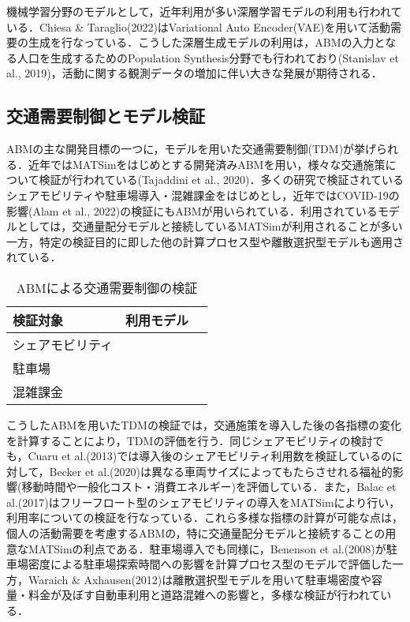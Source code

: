機械学習分野のモデルとして，近年利用が多い深層学習モデルの利用も行われている．Chiesa \& Taraglio(2022)はVariational Auto Encoder(VAE)を用いて活動需要の生成を行なっている．こうした深層生成モデルの利用は，ABMの入力となる人口を生成するためのPopulation Synthesis分野でも行われており(Stanislav et al., 2019)，活動に関する観測データの増加に伴い大きな発展が期待される．

\subsection{交通需要制御とモデル検証}\label{2.2.2}

ABMの主な開発目標の一つに，モデルを用いた交通需要制御(TDM)が挙げられる．近年ではMATSimをはじめとする開発済みABMを用い，様々な交通施策について検証が行われている(Tajaddini et al., 2020)．多くの研究で検証されているシェアモビリティや駐車場導入・混雑課金をはじめとし，近年ではCOVID-19の影響(Alam et al., 2022)の検証にもABMが用いられている．利用されているモデルとしては，交通量配分モデルと接続しているMATSimが利用されることが多い一方，特定の検証目的に即した他の計算プロセス型や離散選択型モデルも適用されている．

\begin{table}[tp]
	\begin{center}
		\caption{ABMによる交通需要制御の検証}
		\label{t3}
		\begin{tabular}{l|rr} 
			検証対象 & 利用モデル & \\ \hline
			シェアモビリティ \\
			駐車場 \\
			混雑課金 \\
		\end{tabular}
	\end{center}
\end{table}

こうしたABMを用いたTDMの検証では，交通施策を導入した後の各指標の変化を計算することにより，TDMの評価を行う．同じシェアモビリティの検討でも，Cuaru et al.(2013)では導入後のシェアモビリティ利用数を検証しているのに対して，Becker et al.(2020)は異なる車両サイズによってもたらさせれる福祉的影響(移動時間や一般化コスト・消費エネルギー)を評価している．また，Balac et al.(2017)はフリーフロート型のシェアモビリティの導入をMATSimにより行い，利用率についての検証を行なっている．これら多様な指標の計算が可能な点は，個人の活動需要を考慮するABMの，特に交通量配分モデルと接続することの用意なMATSimの利点である．駐車場導入でも同様に，Benenson et al.(2008)が駐車場密度による駐車場探索時間への影響を計算プロセス型のモデルで評価した一方，Waraich \& Axhausen(2012)は離散選択型モデルを用いて駐車場密度や容量・料金が及ぼす自動車利用と道路混雑への影響と，多様な検証が行われている．

